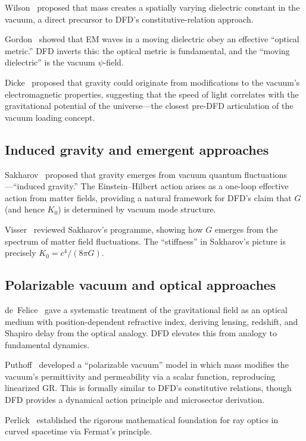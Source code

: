 \documentclass[aps,prd,twocolumn,superscriptaddress,nofootinbib]{revtex4-2}
\begin{document}
Wilson~\cite{Wilson1921} proposed that mass creates a spatially
varying dielectric constant in the vacuum, a direct precursor to
DFD's constitutive-relation approach.

Gordon~\cite{Gordon1923} showed that EM waves in a moving dielectric
obey an effective ``optical metric.''  DFD inverts this: the optical
metric is fundamental, and the ``moving dielectric'' is the vacuum
$\psi$-field.

Dicke~\cite{Dicke1957} proposed that gravity could originate from
modifications to the vacuum's electromagnetic properties, suggesting
that the speed of light correlates with the gravitational potential of
the universe---the closest pre-DFD articulation of the vacuum loading
concept.

\subsection{Induced gravity and emergent approaches}

Sakharov~\cite{Sakharov1967} proposed that gravity emerges from vacuum
quantum fluctuations---``induced gravity.''  The Einstein--Hilbert
action arises as a one-loop effective action from matter fields,
providing a natural framework for DFD's claim that $G$ (and hence
$K_0$) is determined by vacuum mode structure.

Visser~\cite{Visser2002} reviewed Sakharov's programme, showing how
$G$ emerges from the spectrum of matter field fluctuations.  The
``stiffness'' in Sakharov's picture is precisely
$K_0 = c^4/(8\pi G)$.

\subsection{Polarizable vacuum and optical approaches}

de~Felice~\cite{deFelice1971} gave a systematic treatment of the
gravitational field as an optical medium with position-dependent
refractive index, deriving lensing, redshift, and Shapiro delay from
the optical analogy.  DFD elevates this from analogy to fundamental
dynamics.

Puthoff~\cite{Puthoff2002} developed a ``polarizable vacuum'' model
in which mass modifies the vacuum's permittivity and permeability via
a scalar function, reproducing linearized GR\@.  This is formally
similar to DFD's constitutive relations, though DFD provides a
dynamical action principle and microsector derivation.

Perlick~\cite{Perlick2000} established the rigorous mathematical
foundation for ray optics in curved spacetime via Fermat's principle.
\end{document}
